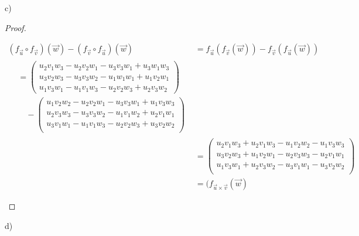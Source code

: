 \documentclass[11pt]{article}
\newcommand{\bproof}{\begin{proof}
$ $ \\
\begin{adjustwidth}{3em}{0pt}
}
\newcommand{\eproof}{\end{adjustwidth}
\end{proof}}
\begin{document}
\begin{flushleft}
\newpage

c) \bigskip

\bproof
	\begin{align*}
	(f_{\vec{u}} \circ  f_{\vec{v}})(\vec{w}) - (f_{\vec{v}} \circ  f_{\vec{u}})(\vec{w}) &= f_{\vec{u}}(f_{\vec{v}}(\vec{w})) - f_{\vec{v}}(f_{\vec{u}}(\vec{w})) \\
	\begin{split}
	&= \begin{pmatrix}
	u_2v_1w_3 - u_2v_2w_1 - u_3v_3w_1 + u_3w_1w_3 \\
	u_3v_2w_3 - u_3v_3w_2 - u_1w_1w_1 + u_1v_2w_1 \\
	u_1v_3w_1 - u_1v_1w_3 - u_2v_2w_3 + u_2v_3w_2
	\end{pmatrix} \\
	& \quad - \begin{pmatrix}
	u_1v_2w_2 - u_2v_2w_1 - u_3v_3w_1 + u_1v_3w_3 \\
	u_2v_3w_3 - u_3v_3w_2 - u_1v_1w_2 + u_2v_1w_1 \\
	u_3v_1w_1 - u_1v_1w_3 - u_2v_2w_3 + u_3v_2w_2 \\
	\end{pmatrix} 
	\end{split} \\
	&= \begin{pmatrix}
	u_2v_1w_3 + u_2v_1w_3 - u_1v_2w_2 - u_1v_3w_3 \\
	u_3v_2w_3 + u_1v_2w_1 - u_2v_3w_3 - u_2v_1w_1 \\
	u_1v_3w_1 + u_2v_3w_2 - u_3v_1w_1 - u_3v_2w_2 \\
	\end{pmatrix}\\
	&= (f_{\vec{u}\times \vec{v}}(\vec{w})
	\end{align*}


\eproof

d) \bigskip


\end{flushleft}
\end{document}
